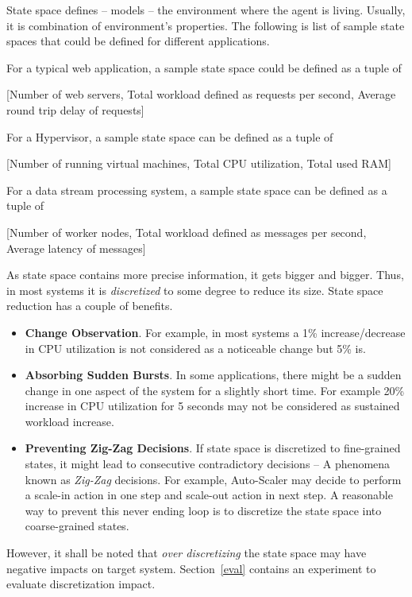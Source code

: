 State space defines -- models -- the environment where the agent is living. Usually, it is combination of environment's properties. The following is list of sample state spaces that could be defined for different applications.
\begin{description}[leftmargin=0pt]
    \item[Web Applications] For a typical web application, a sample state space could be defined as a tuple of
    \begin{center}
        [Number of web servers, Total workload defined as requests per second, Average round trip delay of requests]
    \end{center}
    \item[Virtualization Server] For a Hypervisor, a sample state space can be defined as a tuple of
    \begin{center}
        [Number of running virtual machines, Total CPU utilization, Total used RAM]
    \end{center}
    \item[Stream Processing] For a data stream processing system, a sample state space can be defined as a tuple of
    \begin{center}
        [Number of worker nodes, Total workload defined as messages per second, Average latency of messages]
    \end{center}
\end{description}
As state space contains more precise information, it gets bigger and bigger. Thus, in most systems it is \emph{discretized} to some degree to reduce its size. State space reduction has a couple of benefits.
\begin{itemize}
    \item \textbf{Change Observation}. For example, in most systems a 1\% increase/decrease in CPU utilization is not considered as a noticeable change but 5\% is.
    \item \textbf{Absorbing Sudden Bursts}. In some applications, there might be a sudden change in one aspect of the system for a slightly short time. For example 20\% increase in CPU utilization for 5 seconds may not be considered as sustained workload increase.
    \item \textbf{Preventing Zig-Zag Decisions}. If state space is discretized to fine-grained states, it might lead to consecutive contradictory decisions -- A phenomena known as \emph{Zig-Zag} decisions. For example, Auto-Scaler may decide to perform a scale-in action in one step and scale-out action in next step. A reasonable way to prevent this never ending loop is to discretize the state space into coarse-grained states.
\end{itemize}
However, it shall be noted that \emph{over discretizing} the state space may have negative impacts on target system. Section~\ref{eval} contains an experiment to evaluate discretization impact.


